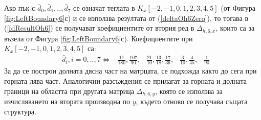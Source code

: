 \documentclass[a4paper]{article}
\newcommand{\rf}[1]{(\ref{#1})}
\theoremstyle{remark}
\begin{document}
\begin{large}
Ако пък с $\bar d_0, \bar d_1, .., \bar d_7$ се означат теглата в $K_x[-2,-1,0,1,2,3,4,5]$ (от Фигура \ref{fig:LeftBoundary6}с) и се използва резултата от \rf{deltaOh6Zero}, то тогава в \rf{fdResultOh6} се получават коефициентите от втория ред в $\Delta_{h,6,x}$, които са за възела от Фигура \ref{fig:LeftBoundary6}с). Коефициентите при $K_x[-2,-1,0,1,2,3,4,5]$ са:
\begin{align}
&\bar d_i, i = 0,..,7 \iff -\frac{11}{180}, \frac{107}{90}, -\frac{21}{10}, \frac{13}{18}, \frac{17}{36}, -\frac{3}{10}, \frac{4}{45}, -\frac{1}{90}
\end{align}
За да се построи долната дясна част на матрцата, се подхожда както до сега при горната лява част. Аналогични разсъждения се прилагат за горната и долната граници на областта при другата матрица $\Delta_{h,6,y}$, която се използва за изчисляването на втората производна по $y$, където отново се получава същата структура.


\end{large}
\end{document}

